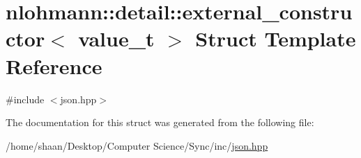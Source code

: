 \hypertarget{structnlohmann_1_1detail_1_1external__constructor}{}\section{nlohmann\+:\+:detail\+:\+:external\+\_\+constructor$<$ value\+\_\+t $>$ Struct Template Reference}
\label{structnlohmann_1_1detail_1_1external__constructor}


{\ttfamily \#include $<$json.\+hpp$>$}



The documentation for this struct was generated from the following file\+:\begin{DoxyCompactItemize}
\item 
/home/shaan/\+Desktop/\+Computer Science/\+Sync/inc/\hyperlink{json_8hpp}{json.\+hpp}\end{DoxyCompactItemize}
